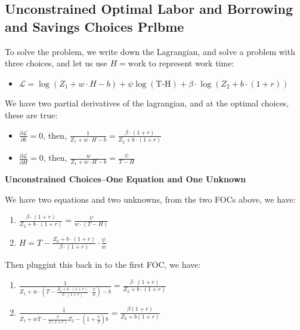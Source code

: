 \documentclass[
]{book}
\providecommand{\tightlist}{%
  \setlength{\itemsep}{0pt}\setlength{\parskip}{0pt}}
\begin{document}
\hypertarget{unconstrained-optimal-labor-and-borrowing-and-savings-choices-prlbme}{%
\subsection{Unconstrained Optimal Labor and Borrowing and Savings Choices Prlbme}\label{unconstrained-optimal-labor-and-borrowing-and-savings-choices-prlbme}}

To solve the problem, we write down the Lagrangian, and solve a problem
with three choices, and let us use \(H=\textrm{work}\) to represent work
time:

\begin{itemize}
\tightlist
\item
  \(\displaystyle \mathcal{L}=\log (Z_1 +w\cdot H-b)+\psi \log (\textrm{T}\textrm{-}\textrm{H})+\beta \cdot \log (Z_2 +b\cdot (1+r))\)
\end{itemize}

We have two partial derivatives of the lagrangian, and at the optimal
choices, these are true:

\begin{itemize}
\item
  \(\frac{\partial \mathcal{L}}{\partial b}=0\), then,
  \(\frac{1}{Z_1 +w\cdot H-b}=\frac{\beta \cdot (1+r)}{Z_2 +b\cdot (1+r)}\)
\item
  \(\frac{\partial \mathcal{L}}{\partial H}=0\), then,
  \(\frac{w}{Z_1 +w\cdot H-b}=\frac{\psi }{T-H}\)
\end{itemize}

\textbf{Unconstrained Choices--One Equation and One Unknown}

We have two equations and two unknowns, from the two FOCs above, we
have:

\begin{enumerate}
\def\labelenumi{\arabic{enumi}.}
\item
  \(\displaystyle \frac{\beta \cdot (1+r)}{Z_2 +b\cdot (1+r)}=\frac{\psi }{w\cdot \left(T-H\right)}\)
\item
  \(\displaystyle H=T-\frac{Z_2 +b\cdot (1+r)}{\beta \cdot (1+r)}\cdot \frac{\psi }{w}\)
\end{enumerate}

Then pluggint this back in to the first FOC, we have:

\begin{enumerate}
\def\labelenumi{\arabic{enumi}.}
\item
  \(\displaystyle \frac{1}{Z_1 +w\cdot \left(T-\frac{Z_2 +b\cdot (1+r)}{\beta \cdot (1+r)}\cdot \frac{\psi }{w}\right)-b}=\frac{\beta \cdot (1+r)}{Z_2 +b\cdot (1+r)}\)
\item
  \(\displaystyle \frac{1}{Z_1 +wT-\frac{\psi }{\beta (1+r)}Z_2 -\left(1+\frac{\psi }{\beta }\right)b}=\frac{\beta (1+r)}{Z_2 +b(1+r)}\)
\end{enumerate}
\end{document}
